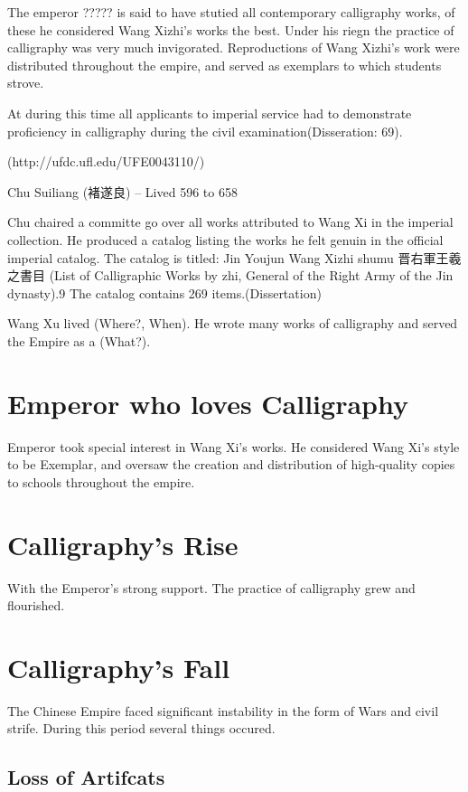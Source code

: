 The emperor ????? is said to have stutied all contemporary calligraphy works, of these he considered Wang Xizhi's works the best.  Under his riegn the practice of calligraphy was very much invigorated.  Reproductions of Wang Xizhi's work were distributed throughout the empire, and served as exemplars to which students strove.

At during this time all applicants to imperial service had to demonstrate proficiency in calligraphy during the civil examination(Disseration: 69).

(http://ufdc.ufl.edu/UFE0043110/)

Chu Suiliang (褚遂良) -- Lived 596 to 658


Chu chaired a committe go over all works attributed to Wang Xi in the imperial collection.  He produced a catalog listing the works he felt genuin in the official imperial catalog.  The catalog is titled: 
Jin Youjun Wang Xizhi shumu 晋右軍王羲之書目 (List of Calligraphic Works by zhi, General of the Right Army of the Jin dynasty).9 The catalog contains 269 items.(Dissertation)


Wang Xu lived (Where?, When).  He wrote many works of calligraphy and served the Empire as a (What?).  

\section{Emperor who loves Calligraphy}

Emperor took special interest in Wang Xi's works.  He considered Wang Xi's style to be Exemplar, and oversaw the creation and distribution of high-quality copies to schools throughout the empire.

\section{Calligraphy's Rise}

With the Emperor's strong support. The practice of calligraphy grew and flourished.

\section{Calligraphy's Fall}

The Chinese Empire faced significant instability in the form of Wars and civil strife.  During this period several things occured.

\subsection{Loss of Artifcats}

